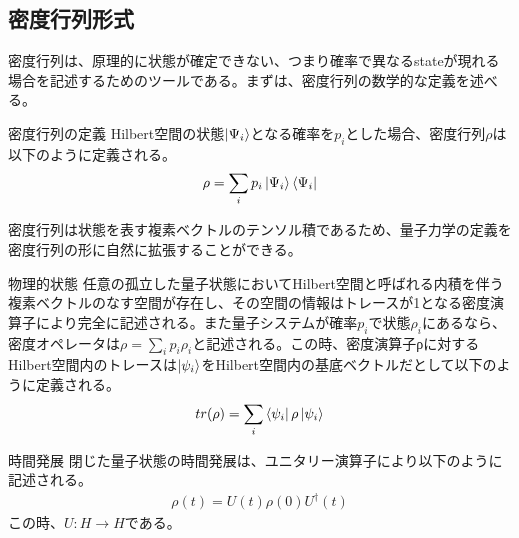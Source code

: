 \documentclass[a4paper,10.5pt]{article}
\numberwithin{equation}{section}
\begin{document}
 \subsection{密度行列形式}
密度行列は、原理的に状態が確定できない、つまり確率で異なるstateが現れる場合を記述するためのツールである。まずは、密度行列の数学的な定義を述べる。
\begin{defbox}{密度行列の定義}
Hilbert空間の状態$\ket{\Psi_{i}}$となる確率を$p_{i}$とした場合、密度行列$\rho$は以下のように定義される。
 \begin{equation}\begin{split}
     \rho = \sum_{i} p_{i} \ket{\Psi_{i}}\bra{\Psi_{i}} 
 \end{split} \end{equation}
\end{defbox}
密度行列は状態を表す複素ベクトルのテンソル積であるため、量子力学の定義を密度行列の形に自然に拡張することができる。
\begin{defbox}{物理的状態}
任意の孤立した量子状態においてHilbert空間と呼ばれる内積を伴う複素ベクトルのなす空間が存在し、その空間の情報はトレースが1となる密度演算子により完全に記述される。また量子システムが確率$p_{i}$で状態$\rho_{i}$にあるなら、密度オペレータは$\rho = \sum_{i} p_{i}\rho_{i}$と記述される。この時、密度演算子ρに対するHilbert空間内のトレースは$\ket{\psi_{i}}$をHilbert空間内の基底ベクトルだとして以下のように定義される。
\begin{equation}\begin{split}
    tr(\rho) =\sum_{i}\bra{\psi_{i}}\rho\ket{\psi_{i}}
\end{split} \end{equation}
\end{defbox}
\begin{defbox}{時間発展}
閉じた量子状態の時間発展は、ユニタリー演算子により以下のように記述される。
\begin{equation}\begin{split}
    \rho(t)= U(t) \rho(0) U^{\dagger}(t)
\end{split} \end{equation}
この時、$U:H\to H$である。
\end{defbox}
\end{document}
